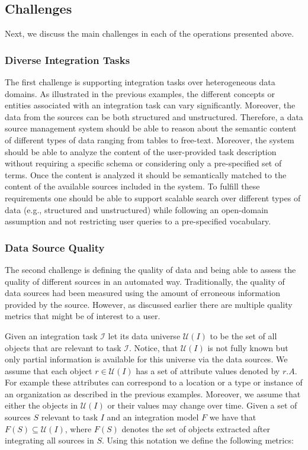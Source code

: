 \documentclass{sig-alternate}
\begin{document}
\subsection{Challenges}
Next, we discuss the main challenges in each of the operations presented above. 
\subsubsection{Diverse Integration Tasks}
\label{sec:diverse}
The first challenge is supporting integration tasks over heterogeneous data domains. As illustrated in the previous examples, the different concepts or entities associated with an integration task can vary significantly. Moreover, the data from the sources can be both structured and unstructured. Therefore, a data source management system should be able to reason about the semantic content of different types of data ranging from tables to free-text. Moreover, the system should be able to analyze the content of the user-provided task description without requiring a specific schema or considering only a pre-specified set of terms. Once the content is analyzed it should be semantically matched to the content of the available sources included in the system. To fulfill these requirements one should be able to support scalable search over different types of data (e.g., structured and unstructured) while following an open-domain assumption and not restricting user queries to a pre-specified vocabulary.

\subsubsection{Data Source Quality} 
\label{sec:quality}
The second challenge is defining the quality of data and being able to assess the quality of different sources in an automated way. Traditionally, the quality of data sources had been measured using the amount of erroneous information provided by the source. However, as discussed earlier there are multiple quality metrics that might be of interest to a user. 

Given an integration task $\mathcal{I}$ let its data universe $\mathcal{U}(I)$ to be the set of all objects that are relevant to task $\mathcal{I}$. Notice, that $\mathcal{U}(I)$ is not fully known but only partial information is available for this universe via the data sources. We assume that each object $r \in \mathcal{U}(I)$ has a set of attribute values denoted by $r.A$. For example these attributes can correspond to a location or a type or instance of an organization as described in the previous examples. Moreover, we assume that either the objects in $\mathcal{U}(I)$ or their values may change over time. Given a set of sources $S$ relevant to task $I$ and an integration model $F$ we have that $F(S) \subseteq \mathcal{U}(I)$, where $F(S)$ denotes the set of objects extracted after integrating all sources in $S$. Using this notation we define the following metrics:
\end{document}

